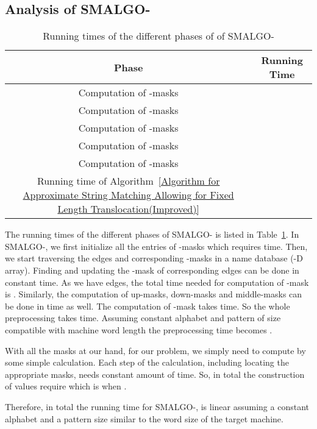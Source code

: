 \documentclass{llncs}
\newcommand{\rom}[1]{\uppercase\expandafter{\romannumeral #1\relax}}
\begin{document}
{\subsection{Analysis of SMALGO-\rom{2}}\label{analysis}



\begin{table}
\begin{center}
\begin{tabular}{|c|c|}
\hline
Phase&Running Time\\
\hline
Computation of -masks&\\
\hline
Computation of -masks&\\
\hline
Computation of -masks&\\
\hline
Computation of -masks&\\
\hline
Computation of -masks&\\
\hline
Running time of Algorithm~\ref{Algorithm for Approximate String Matching Allowing for Fixed Length Translocation(Improved)}&\\
\hline
\end{tabular}
\caption{Running times of the different phases of of SMALGO-\rom{2}}
\label{Table_RunningTime2}
\end{center}
\end{table}




The running times of the different phases of SMALGO-\rom{2} is listed in Table~\ref{Table_RunningTime2}. In SMALGO-\rom{2}, we first initialize all the entries of -masks which requires  time. Then, we start traversing the edges and corresponding -masks in a name database (-D array). Finding and updating the -mask of corresponding edges can be done in constant time. As we have  edges, the total time needed for computation of -mask is . 
Similarly, the computation of up-masks, down-masks and middle-masks can be done in  time as well. The computation of -mask takes  time.
So the whole preprocessing takes  time. Assuming constant alphabet  and pattern of size compatible with machine word length the preprocessing time becomes .


With all the masks at our hand, for our problem, we simply need to compute  by some simple calculation. Each step of the calculation, including locating the appropriate masks, needs constant amount of time. So, in total the construction of  values require  which is  when .

 
Therefore, in total the running time for SMALGO-\rom{2}, is linear
assuming a constant alphabet and a pattern size similar to the word size of the target machine.

















}
\end{document}
